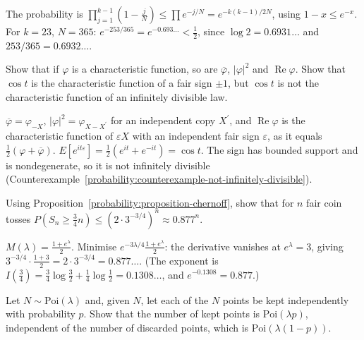 \begin{solution}
The probability is $\prod_{j=1}^{k-1}(1 - \frac jN) \leq \prod e^{-j/N} = e^{-k(k-1)/2N}$, using $1 - x \leq e^{-x}$. For $k = 23$, $N = 365$: $e^{-253/365} = e^{-0.693\ldots} < \frac12$, since $\log 2 = 0.6931\ldots$ and $253/365 = 0.6932\ldots$.
\end{solution}

\begin{exercise}\label{probability:exercise-characteristic-symmetrisation}
Show that if $\varphi$ is a characteristic function, so are $\overline\varphi$, $|\varphi|^2$ and $\operatorname{Re}\varphi$. Show that $\cos t$ is the characteristic function of a fair sign $\pm1$, but $\cos t$ is not the characteristic function
of an infinitely divisible law.
\end{exercise}

\begin{solution}
$\overline\varphi = \varphi_{-X}$, $|\varphi|^2 = \varphi_{X - X^{\prime}}$ for an independent copy $X^{\prime}$, and $\operatorname{Re}\varphi$ is the characteristic function of $\varepsilon X$ with an independent fair sign $\varepsilon$, as it equals
$\frac12(\varphi + \overline\varphi)$. $E[e^{it\varepsilon}] = \frac12(e^{it} + e^{-it}) = \cos t$. The sign has bounded support and is nondegenerate, so it is not infinitely divisible
(Counterexample~\ref{probability:counterexample-not-infinitely-divisible}).
\end{solution}

\begin{exercise}\label{probability:exercise-chernoff-coin}
Using Proposition~\ref{probability:proposition-chernoff}, show that for $n$ fair coin tosses $P(S_n \geq \frac34n) \leq (2\cdot 3^{-3/4})^n \approx 0.877^n$.
\end{exercise}

\begin{solution}
$M(\lambda) = \frac{1 + e^\lambda}{2}$. Minimise $e^{-3\lambda/4}\frac{1 + e^\lambda}{2}$: the derivative vanishes at $e^\lambda = 3$, giving $3^{-3/4}\cdot\frac{1 + 3}{2} = 2\cdot 3^{-3/4} = 0.877\ldots$. (The exponent is $I(\frac34) = \frac34\log\frac32 + \frac14\log\frac12 = 0.1308\ldots$, and
$e^{-0.1308} = 0.877$.)
\end{solution}

\begin{exercise}\label{probability:exercise-poisson-thinning}
Let $N \sim \mathrm{Poi}(\lambda)$ and, given $N$, let each of the $N$ points be kept independently with probability $p$. Show that the number of kept points is $\mathrm{Poi}(\lambda p)$, independent of the number of discarded
points, which is $\mathrm{Poi}(\lambda(1 - p))$.
\end{exercise}

